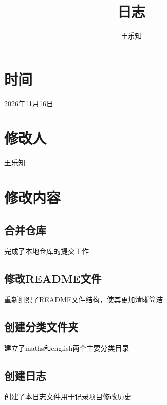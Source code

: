 \documentclass[UTF8,12pt]{ctexart}
\title{日志}
\author{王乐知}
\begin{document}
\maketitle

\section{时间}
2026年11月16日

\section{修改人}
王乐知

\section{修改内容}
\subsection{合并仓库}
完成了本地仓库的提交工作

\subsection{修改README文件}
重新组织了README文件结构，使其更加清晰简洁

\subsection{创建分类文件夹}
建立了maths和english两个主要分类目录

\subsection{创建日志}
创建了本日志文件用于记录项目修改历史
\end{document}
